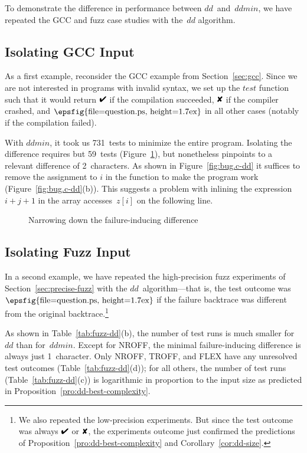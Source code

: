 \documentclass{acm_proc_article-sp}
\newcommand{\FLEX}       {{\small FLEX}\xspace}
\newcommand{\GCC}        {{\small GCC}\xspace}
\newcommand{\NROFF}      {{\small NROFF}\xspace}
\newcommand{\TROFF}      {{\small TROFF}\xspace}
\newcommand{\PASS}{\text{\ding{52}}\xspace}
\newcommand{\FAIL}{\text{\ding{56}}\xspace}
\newcommand{\UNRESOLVED}{\lower0.1ex\hbox{\epsfig{file=question.ps, 
      height=1.7ex}}}
\newcommand{\dd}{\textit{dd}\xspace}
\newcommand{\test}{\textit{test}\xspace}
\newcommand{\ddmin}{\textit{ddmin}\xspace}
\newcommand{\codeid}[1]{\text{\upshape\texttt{#1}}}
\def\<#1>{\codeid{#1}}
\theoremstyle{plain}
\let\oldfootnote=\footnote
\renewcommand{\footnote}[1]{\oldfootnote{\let\small=\scriptsize #1}}
\begin{document}
To demonstrate the difference in performance between
$\dd$~and~$\ddmin$, we have repeated the \GCC and fuzz case studies
with the~$\dd$ algorithm.  

\subsection{Isolating GCC Input}

As a first example, reconsider the \GCC example from
Section~\ref{sec:gcc}.  Since we are not interested in programs with
invalid syntax, we set up the $\test$ function such that it would
return $\PASS$ if the compilation succeeded, $\FAIL$ if the compiler
crashed, and $\UNRESOLVED$ in all other cases (notably if the
compilation failed).

With $\ddmin$, it took us 731~tests to minimize the entire program.
Isolating the difference requires but 59~tests
(Figure~\ref{fig:bug.c-dd-plot}), but nonetheless pinpoints to a
relevant difference of 2~characters.  As shown in
Figure~\ref{fig:bug.c-dd} it suffices to remove the assignment to $i$
in the \<mult> function to make the program work
(Figure~\ref{fig:bug.c-dd}(b)).  This suggests a problem with inlining
the expression $i + j + 1$ in the array accesses~$z[i]$ on the
following line.

\begin{figure}[t]
\vspace{-1.1cm}
\vspace{-0.5cm}
\caption{Narrowing down the failure-inducing difference}
\label{fig:bug.c-dd-plot}
\end{figure}

\subsection{Isolating Fuzz Input}

In a second example, we have repeated the high-precision fuzz
experiments of Section~\ref{sec:precise-fuzz} with the
$\dd$~algorithm---that is, the test outcome was $\UNRESOLVED$ if the
failure backtrace was different from the original backtrace.\footnote{We
  also repeated the low-precision experiments.  But since the test
  outcome was always $\PASS$ or $\FAIL$, the experiments outcome just
  confirmed the predictions of
  Proposition~\ref{pro:dd-best-complexity} and
  Corollary~\ref{cor:dd-size}.}

As shown in Table~\ref{tab:fuzz-dd}(b), the number of test runs is
much smaller for~$\dd$ than for~$\ddmin$.  Except for \NROFF, the
minimal failure-inducing difference is always just 1~character.  Only
\NROFF, \TROFF, and \FLEX have any unresolved test outcomes
(Table~\ref{tab:fuzz-dd}(d)); for all others, the number of test runs
(Table~\ref{tab:fuzz-dd}(c)) is logarithmic in proportion to the input
size as predicted in Proposition~\ref{pro:dd-best-complexity}.
\end{document}
